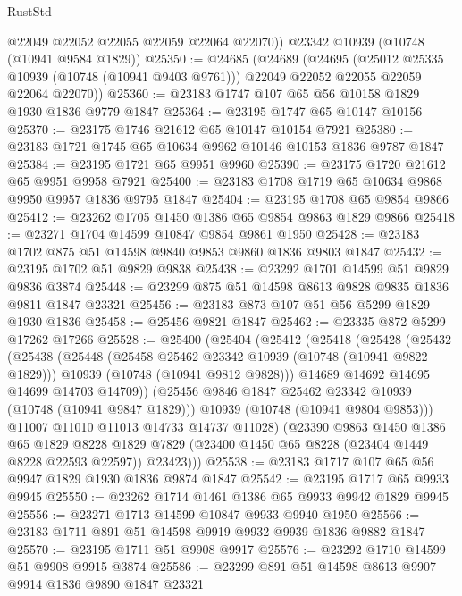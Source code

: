 \begin{lexlean}{RustStd}
\begin{coremodule}
        @22049
        @22052
        @22055
        @22059
        @22064
        @22070))
    @23342
    @10939
    (@10748 (@10941 @9584 @1829))
@25350 := @24685
    (@24689
      (@24695
        (@25012 @25335 @10939 (@10748 (@10941 @9403 @9761)))
        @22049
        @22052
        @22055
        @22059
        @22064
        @22070))
@25360 := @23183 @1747 @107 @65 @56 @10158 @1829 @1930 @1836 @9779 @1847
@25364 := @23195 @1747 @65 @10147 @10156
@25370 := @23175 @1746 @21612 @65 @10147 @10154 @7921
@25380 := @23183 @1721 @1745 @65 @10634 @9962 @10146 @10153 @1836 @9787 @1847
@25384 := @23195 @1721 @65 @9951 @9960
@25390 := @23175 @1720 @21612 @65 @9951 @9958 @7921
@25400 := @23183 @1708 @1719 @65 @10634 @9868 @9950 @9957 @1836 @9795 @1847
@25404 := @23195 @1708 @65 @9854 @9866
@25412 := @23262 @1705 @1450 @1386 @65 @9854 @9863 @1829 @9866
@25418 := @23271 @1704 @14599 @10847 @9854 @9861 @1950
@25428 := @23183 @1702 @875 @51 @14598 @9840 @9853 @9860 @1836 @9803 @1847
@25432 := @23195 @1702 @51 @9829 @9838
@25438 := @23292 @1701 @14599 @51 @9829 @9836 @3874
@25448 := @23299 @875 @51 @14598 @8613 @9828 @9835 @1836 @9811 @1847 @23321
@25456 := @23183 @873 @107 @51 @56 @5299 @1829 @1930 @1836
@25458 := @25456 @9821 @1847
@25462 := @23335 @872 @5299 @17262 @17266
@25528 := @25400
    (@25404
      (@25412
        (@25418
          (@25428
            (@25432
              (@25438
                (@25448
                  (@25458 @25462 @23342 @10939 (@10748 (@10941 @9822 @1829)))
                  @10939
                  (@10748 (@10941 @9812 @9828)))
                @14689
                @14692
                @14695
                @14699
                @14703
                @14709))
            (@25456 @9846 @1847 @25462 @23342 @10939 (@10748 (@10941 @9847 @1829)))
            @10939
            (@10748 (@10941 @9804 @9853)))
          @11007
          @11010
          @11013
          @14733
          @14737
          @11028)
        (@23390
          @9863
          @1450
          @1386
          @65
          @1829
          @8228
          @1829
          @7829
          (@23400 @1450 @65 @8228 (@23404 @1449 @8228 @22593 @22597))
          @23423)))
@25538 := @23183 @1717 @107 @65 @56 @9947 @1829 @1930 @1836 @9874 @1847
@25542 := @23195 @1717 @65 @9933 @9945
@25550 := @23262 @1714 @1461 @1386 @65 @9933 @9942 @1829 @9945
@25556 := @23271 @1713 @14599 @10847 @9933 @9940 @1950
@25566 := @23183 @1711 @891 @51 @14598 @9919 @9932 @9939 @1836 @9882 @1847
@25570 := @23195 @1711 @51 @9908 @9917
@25576 := @23292 @1710 @14599 @51 @9908 @9915 @3874
@25586 := @23299 @891 @51 @14598 @8613 @9907 @9914 @1836 @9890 @1847 @23321

\end{coremodule}
\end{lexlean}
